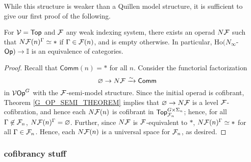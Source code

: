 \documentclass[a4paper,10pt]{article}%
\begin{document}
While this structure is weaker than a Quillen model structure, it is sufficient to give our first proof of the following.
\begin{corollary}
  \label{N_INFINITY_REALIZATION_COROLLARY}
  For $\mathcal V = \mathsf{Top}$ and $\mathcal F$ any weak indexing system, there exists an operad $N\mathcal F$ such that $N\mathcal F(n)^\Gamma \simeq *$ if $\Gamma \in \mathcal F(n)$, and is empty otherwise. In particular, $\mathrm{Ho}(N_\infty$-$\mathsf{Op}) \to \mathbb I$ is an equivalence of categories.%
\end{corollary}
\begin{proof}
  Recall that $\mathsf{Comm}(n) = *$ for all $n$. Consider the functorial factorization 
  \[
  \varnothing \to N\mathcal F \xrightarrow{\sim} \mathsf{Comm}
  \]
  in $\mathcal V\mathsf{Op}^{G}$ with the $\mathcal F$-semi-model structure. Since the initial operad is cofibrant, Theorem \ref{G_OP_SEMI_THEOREM} implies that $\varnothing \to N\mathcal F$ is a level $\mathcal F$-cofibration, and hence each $N\mathcal F(n)$ is cofibrant in $\mathsf{Top}^{G\times \Sigma_n}_{\mathcal F_n}$; hence, for all $\Gamma \not\in\mathcal F_n$, $N\mathcal F(n)^\Gamma = \varnothing$. Further, since $N\mathcal F$ is $\mathcal F$-equivalent to $*$, $N\mathcal F(n)^\Gamma \simeq *$ for all $\Gamma \in \mathcal F_n$. Hence, each $N\mathcal F(n)$ is a universal space for $\mathcal F_n$, as desired.
\end{proof}


\subsubsection{cofibrancy stuff}
\end{document}
